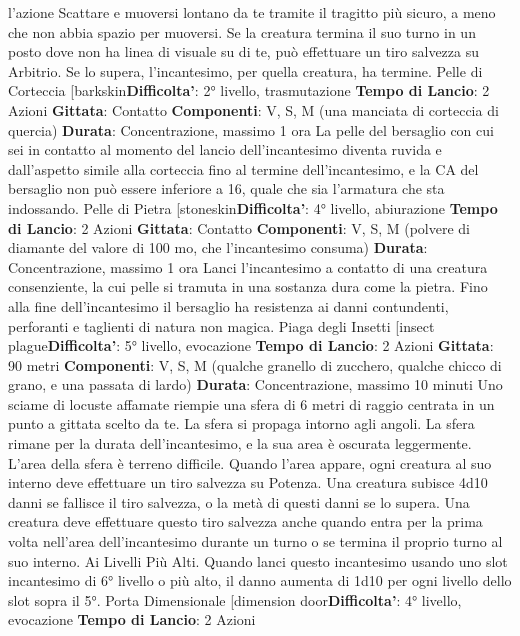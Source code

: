 \begin{multicols}{2}
l’azione Scattare e muoversi lontano da te tramite il
tragitto più sicuro, a meno che non abbia spazio per
muoversi. Se la creatura termina il suo turno in un posto
dove non ha linea di visuale su di te, può effettuare un
tiro salvezza su Arbitrio. Se lo supera, l’incantesimo,
per quella creatura, ha termine.
Pelle di Corteccia
[barkskin\textbf{Difficolta'}:
2° livello, trasmutazione
\textbf{Tempo di Lancio}: 2 Azioni
\textbf{Gittata}: Contatto
\textbf{Componenti}: V, S, M (una manciata di corteccia di
quercia)
\textbf{Durata}: Concentrazione, massimo 1 ora
La pelle del bersaglio con cui sei in contatto al
momento del lancio dell’incantesimo diventa ruvida e
dall’aspetto simile alla corteccia fino al termine
dell’incantesimo, e la CA del bersaglio non può essere
inferiore a 16, quale che sia l’armatura che sta
indossando.
Pelle di Pietra
[stoneskin\textbf{Difficolta'}:
4° livello, abiurazione
\textbf{Tempo di Lancio}: 2 Azioni
\textbf{Gittata}: Contatto
\textbf{Componenti}: V, S, M (polvere di diamante del valore di
100 mo, che l’incantesimo consuma)
\textbf{Durata}: Concentrazione, massimo 1 ora
Lanci l’incantesimo a contatto di una creatura
consenziente, la cui pelle si tramuta in una sostanza
dura come la pietra. Fino alla fine dell’incantesimo il
bersaglio ha resistenza ai danni contundenti, perforanti
e taglienti di natura non magica.
Piaga degli Insetti
[insect plague\textbf{Difficolta'}:
5° livello, evocazione
\textbf{Tempo di Lancio}: 2 Azioni
\textbf{Gittata}: 90 metri
\textbf{Componenti}: V, S, M (qualche granello di zucchero,
qualche chicco di grano, e una passata di lardo)
\textbf{Durata}: Concentrazione, massimo 10 minuti
Uno sciame di locuste affamate riempie una sfera di 6
metri di raggio centrata in un punto a gittata scelto da
te. La sfera si propaga intorno agli angoli. La sfera
rimane per la durata dell’incantesimo, e la sua area è
oscurata leggermente. L’area della sfera è terreno
difficile.
Quando l’area appare, ogni creatura al suo interno deve
effettuare un tiro salvezza su Potenza. Una
creatura subisce 4d10 danni se fallisce il tiro
salvezza, o la metà di questi danni se lo supera. Una
creatura deve effettuare questo tiro salvezza anche
quando entra per la prima volta nell’area
dell’incantesimo durante un turno o se termina il proprio
turno al suo interno.
Ai Livelli Più Alti. Quando lanci questo incantesimo
usando uno slot incantesimo di 6° livello o più alto, il
danno aumenta di 1d10 per ogni livello dello slot sopra
il 5°.
Porta Dimensionale
[dimension door\textbf{Difficolta'}:
4° livello, evocazione
\textbf{Tempo di Lancio}: 2 Azioni

\end{multicols}
